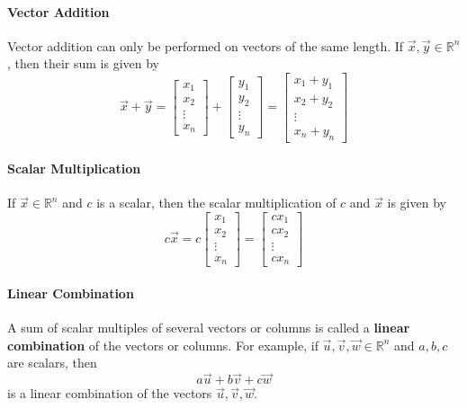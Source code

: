 \paragraph*{Vector Addition} Vector addition can only be performed on vectors of the same length. If $\vec{x}, \vec{y} \in \mathbb{R}^n$, then their sum is given by
\[\vec{x} + \vec{y} = \begin{bmatrix}
    x_1 \\
    x_2 \\
    \vdots \\
    x_n
\end{bmatrix} + \begin{bmatrix}
    y_1 \\
    y_2 \\
    \vdots \\
    y_n
\end{bmatrix} = \begin{bmatrix}
    x_1 + y_1 \\
    x_2 + y_2 \\
    \vdots \\
    x_n + y_n
\end{bmatrix}\]

\paragraph*{Scalar Multiplication} If $\vec{x} \in \mathbb{R}^n$ and $c$ is a scalar, then the scalar multiplication of $c$ and $\vec{x}$ is given by
\[c\vec{x} = c \begin{bmatrix}
    x_1 \\
    x_2 \\
    \vdots \\
    x_n
\end{bmatrix} = \begin{bmatrix}
    cx_1 \\
    cx_2 \\
    \vdots \\
    cx_n
\end{bmatrix}\]

\paragraph*{Linear Combination}
A sum of scalar multiples of several vectors or columns is called a \textbf{linear combination} of the vectors or columns.
For example, if $\vec{u}, \vec{v}, \vec{w} \in \mathbb{R}^n$ and $a, b, c$ are scalars, then
\[a\vec{u} + b\vec{v} + c\vec{w}\]
is a linear combination of the vectors $\vec{u}, \vec{v}, \vec{w}$.
\pagebreak

